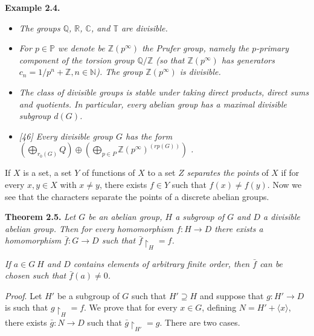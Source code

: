 \documentclass[12pt]{article}
\begin{document}
    
    \textbf{Example 2.4.}
    

        \begin{itemize}

            \item \emph{The groups $ \mathbb{Q} $, $ \mathbb{R} $, $ \mathbb{C} $, and $ \mathbb{T} $ are divisible.}

            \item \emph{For $ p \in \mathbb{P} $ we denote be $ \mathbb{Z} (p^{\infty}) $ the Prufer group, namely the $p$-primary component of the torsion group
            $ \mathbb{Q} / \mathbb{Z} $ (so that $ \mathbb{Z} (p^{\infty})$ has generators $ c_n = 1/p^{n} + \mathbb{Z}, n \in \mathbb{N} $). The group $ \mathbb{Z}(p^{\infty}) $ is divisible.}

            \item \emph{The class of divisible groups is stable under taking direct products, direct sums and quotients.
            In particular, every abelian group has a maximal divisible subgroup $d(G)$.}

            \item \emph{[46] Every divisible group $ G $ has the form $(\bigoplus_{ r_{0} (G) } Q) \oplus (\bigoplus_{p \in P} \mathbb{Z} (p^{\infty})^ {(rp(G))} )$ .}

        \end{itemize}


        If $X$ is a set, a set $Y$ of functions of $X$ to a set $Z$ \emph{separates the points} of $X$ if for every $x, y \in X$ with $x \neq y$,
    there exists $f \in Y$ such that $f(x) \neq f(y)$. Now we see that the characters separate the points of a discrete
    abelian groups.


    \textbf{Theorem 2.5.} \emph{Let $ G $ be an abelian group, $ H $ a subgroup of $ G $ and $ D $ a divisible abelian group. Then for every
    homomorphism $ f : H \to D $ there exists a homomorphism $ \bar{f} : G \to D $ such that $ \bar{f} \upharpoonright_{H} = f $.}
    
    
        \emph{If $ a \in G \ H $ and $ D $ contains elements of arbitrary finite order, then $ \bar{f} $ can be chosen such that $ \bar{f} (a) \neq 0 $.}
    
    
        \emph{Proof}. Let $ H' $ be a subgroup of $ G $ such that $H' \supseteq H $ and suppose that $ g : H' \to D $ is such that $ g \upharpoonright_{H} = f $. We
    prove that for every $ x \in G $, defining $ N = H' + \langle x \rangle $, there exists $ \bar{g} : N \to D $ such that  $ \bar{g} \upharpoonright_{H'} = g $. There are two
    cases.
    
\end{document}
